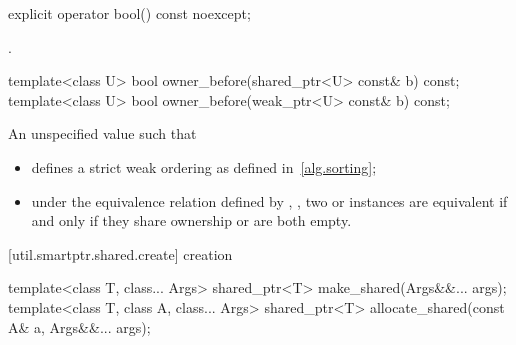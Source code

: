%
\begin{itemdecl}
explicit operator bool() const noexcept;
\end{itemdecl}

\begin{itemdescr}
\pnum\returns {}.
\end{itemdescr}

%
\begin{itemdecl}
template<class U> bool owner_before(shared_ptr<U> const& b) const;
template<class U> bool owner_before(weak_ptr<U> const& b) const;
\end{itemdecl}

\begin{itemdescr}
\pnum
\returns An unspecified value such that

\begin{itemize}
\item {} defines a strict weak ordering as defined in~\ref{alg.sorting};

\item under the equivalence relation defined by ,
, two  or
 instances are equivalent if and only if they share ownership or
are both empty.
\end{itemize}

\end{itemdescr}


[util.smartptr.shared.create]{ creation}

%
%
\begin{itemdecl}
template<class T, class... Args> shared_ptr<T> make_shared(Args&&... args);
template<class T, class A, class... Args>
  shared_ptr<T> allocate_shared(const A& a, Args&&... args);
\end{itemdecl}

